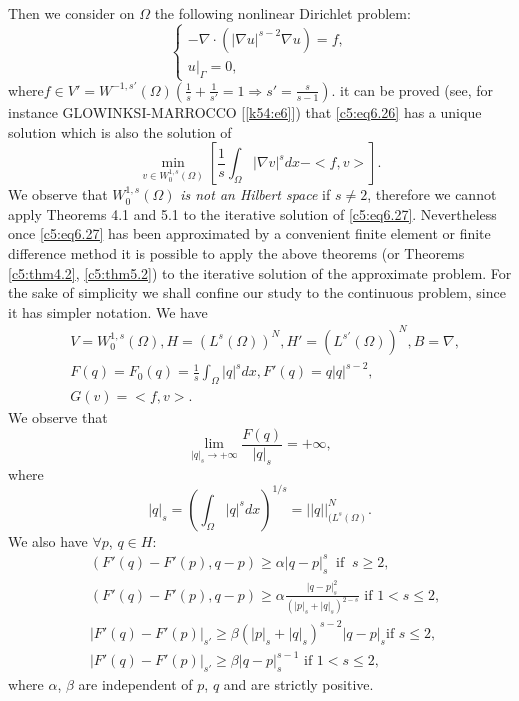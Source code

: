  Then we consider on $\Omega$ the following nonlinear Dirichlet problem: 
\begin{equation}
\begin{cases}
- \nabla \cdot (|\nabla u |^{s-2}\nabla u) = f, \\
u|_\Gamma = 0, \tag{6.26}\label{c5:eq6.26}
\end{cases}
\end{equation}
where\pageoriginale $f \in V' = W^{-1,  s'}(\Omega ) (\frac{1}{s} +
\frac{1}{s'}  
= 1 \Rightarrow s' = \frac{s}{s-1})$.  it can be proved (see,  for 
instance GLOWINKSI-MARROCCO [\ref{k54:e6}]) that \eqref{c5:eq6.26} has a unique 
solution which is also the solution of    
\begin{equation}
\min_{v \in W^{1, s}_0 (\Omega )} \left[\frac{1}{s}\int_\Omega 
|\nabla v |^s dx - < f,  v > \right]. \tag{6.27}\label{c5:eq6.27} 
\end{equation}
We observe that $W^{1, s}_0 (\Omega )$ \textit{is not an Hilbert space} 
if $s \neq 2$, therefore we cannot apply Theorems 4.1 and 5.1 to the 
iterative solution of \eqref{c5:eq6.27}. Nevertheless once 
\eqref{c5:eq6.27} has been approximated by a convenient finite element 
or finite difference method it is possible to apply the above theorems 
(or Theorems \ref{c5:thm4.2}, \ref{c5:thm5.2}) to the iterative solution of the approximate 
problem. For the sake of simplicity we shall confine our study to the 
continuous problem, since it has simpler notation. We have        
\begin{align*}
&V= W^{1, s}_0(\Omega ),  H = (L^s (\Omega ))^N ,  H' = (L^{s'}(\Omega
  ))^N,  B = \nabla,  \\ 
&F (q) = F_0 (q) = \frac{1}{s}\int_\Omega |q|^s dx,  F' (q) =
  q|q|^{s-2}, \\ 
& G(v) =  < f,  v >. 
\end{align*} 
We observe that 
$$
\lim_{|q|_s \to + \infty }\frac{F(q)}{|q|_s}= + \infty,  
$$
where 
$$
|q|_s = (\int_\Omega  | q|^s dx ) ^{1/s}= ||q||_{(L^s (\Omega)}^N. 
$$
We also have $\forall p$, $q \in H$: 
\begin{align*}
&(F'(q) - F'(p), q - p) \geq \alpha |q-p|^s_s ~\text{ if }~ s\geq 2,
  \tag{6.28}\label{c5:eq6.28}\\ 
&(F'(q) - F'(p), q - p) \geq \alpha \frac{|q-p|^2_s}{(|p|_s+ |q|_s
    )^{2-s}} \text{ if }1  < s \leq 2,  \tag{6.29}\label{c5:eq6.29}\\ 
&|F'(q)-F'(p) |_{s'} \geq \beta (|p|_s + |q|_s )^{s-2}|q-p|_s  \text{
    if } s \leq 2, \tag{6.30}\label{c5:eq6.30}\\ 
&|F' (q) - F'(p) |_{s'} \geq \beta |q-p|^{s-1}_s \text{ if } 1 < s
  \leq 2, \tag{6.31}\label{c5:eq6.31} 
\end{align*}
where $\alpha$, $\beta$ are independent of $p$, $q$ and are strictly
positive.  

